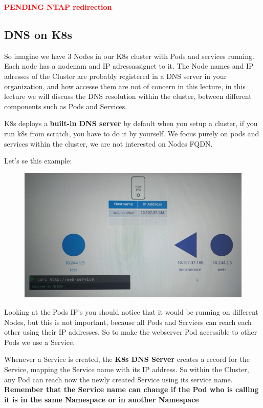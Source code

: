 \documentclass{article}
\begin{document}
\textcolor{red}{\textbf{PENDING NTAP redirection}}

\subsection{DNS on K8s}

So imagine we have 3 Nodes in our K8s cluster with Pods and services running. Each node has a nodenam and IP adressassignet to it. The Node names and IP adresses  of the Cluster are probably registered in a DNS server in your organization, and how accesse them are not of concern in this lecture, in this lecture we will discuss the DNS resolution within the cluster, between different components such as Pods and Services.

K8s deploys a \textbf{built-in DNS server} by default when you setup a cluster, if you run k8s from scratch, you have to do it by yourself. We focus purely on pods and services within the cluster, we are not interested on Nodes FQDN. 

Let's se this example:

\begin{figure}[H]
    \centering
    \includegraphics[width=\textwidth]{pictures/ingress1.png}
\end{figure}

Looking at the Pods IP's you should notice that it would be running on different Nodes, but this is not important, because all Pods and Services can reach each other using their IP addresses. So to make the webserver Pod accessible to other Pods we use a Service.

Whenever a Service is created, the \textbf{K8s DNS Server} creates a record for the Service, mapping the Service name with its IP address. So within the Cluster, any Pod can reach now the newly created Service using its service name. \textbf{Remember that the Service name can change if the Pod who is calling it is in the same Namespace or in another Namespace}
\end{document}
